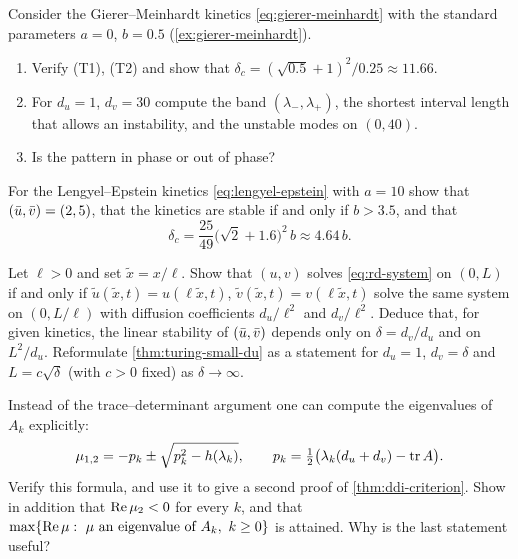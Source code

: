 \begin{exercise}\label{exer:turing-gm}
Consider the Gierer--Meinhardt kinetics \eqref{eq:gierer-meinhardt} with the standard
parameters $a=0$, $b=0.5$ (\cref{ex:gierer-meinhardt}).
\begin{enumerate}[label=(\alph*)]
  \item Verify (T1), (T2) and show that $\delta_c=(\sqrt{0.5}+1)^2/0.25\approx 11.66$.
  \item For $d_u=1$, $d_v=30$ compute the band $(\lambda_-,\lambda_+)$, the shortest
        interval length that allows an instability, and the unstable modes on $(0,40)$.
  \item Is the pattern in phase or out of phase?
\end{enumerate}
\end{exercise}

\begin{exercise}\label{exer:turing-lengyel-epstein}
For the Lengyel--Epstein kinetics \eqref{eq:lengyel-epstein} with $a=10$ show that
$(\bar u,\bar v)=(2,5)$, that the kinetics are stable if and only if $b>3.5$, and that
\begin{equation*}
  \delta_c = \frac{25}{49}\big(\sqrt2+1.6\big)^2\,b\approx 4.64\,b .
\end{equation*}
\end{exercise}

\begin{exercise}\label{exer:turing-scaling}
Let $\ell>0$ and set $\tilde x=x/\ell$. Show that $(u,v)$ solves \eqref{eq:rd-system}
on $(0,L)$ if and only if $\tilde u(\tilde x,t)=u(\ell\tilde x,t)$,
$\tilde v(\tilde x,t)=v(\ell\tilde x,t)$ solve the same system on $(0,L/\ell)$ with
diffusion coefficients $d_u/\ell^2$ and $d_v/\ell^2$. Deduce that, for given kinetics,
the linear stability of $(\bar u,\bar v)$ depends only on $\delta=d_v/d_u$ and on $L^2/d_u$.
Reformulate \cref{thm:turing-small-du} as a statement for $d_u=1$, $d_v=\delta$
and $L=c\sqrt\delta$ (with $c>0$ fixed) as $\delta\to\infty$.
\end{exercise}

\begin{exercise}[$\ast$]\label{exer:turing-explicit-roots}
Instead of the trace--determinant argument one can compute the eigenvalues of
$A_k$ explicitly:
\begin{equation*}
  \mu_{1,2} = -p_k\pm\sqrt{p_k^2-h(\lambda_k)},\qquad
  p_k=\tfrac12\big(\lambda_k(d_u+d_v)-\operatorname{tr} A\big).
\end{equation*}
Verify this formula, and use it to give a second proof of \cref{thm:ddi-criterion}.
Show in addition that $\operatorname{Re}\mu_2<0$ for every $k$, and that $\max\{\operatorname{Re}\mu:\ \mu \text{ an eigenvalue of } A_k,\ k\ge0\}$
is attained. Why is the last statement useful?
\end{exercise}
